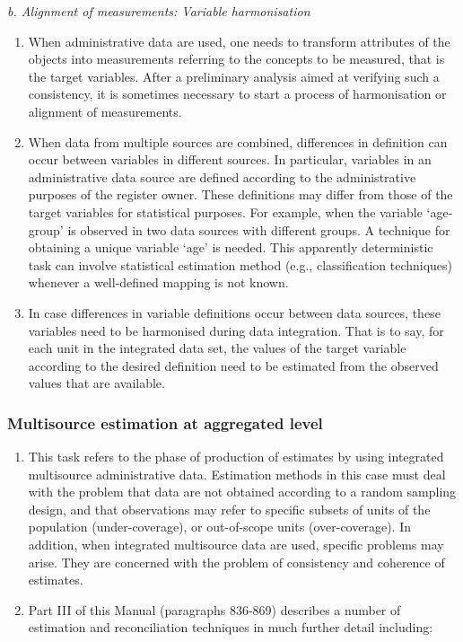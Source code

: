 \documentclass[
]{article}
\begin{document}
\emph{b. Alignment of measurements: Variable harmonisation}

\begin{enumerate}
\def\labelenumi{\arabic{enumi}.}
\setcounter{enumi}{231}
\item
  When administrative data are used, one needs to transform
  attributes of the objects into measurements referring to the
  concepts to be measured, that is the target variables. After a
  preliminary analysis aimed at verifying such a consistency, it is
  sometimes necessary to start a process of harmonisation or alignment
  of measurements.
\item
  When data from multiple sources are combined, differences in
  definition can occur between variables in different sources. In
  particular, variables in an administrative data source are defined
  according to the administrative purposes of the register owner.
  These definitions may differ from those of the target variables for
  statistical purposes. For example, when the variable `age-group' is
  observed in two data sources with different groups. A technique for
  obtaining a unique variable `age' is needed. This apparently
  deterministic task can involve statistical estimation method (e.g.,
  classification techniques) whenever a well-defined mapping is not
  known.
\item
  In case differences in variable definitions occur between data
  sources, these variables need to be harmonised during data
  integration. That is to say, for each unit in the integrated data
  set, the values of the target variable according to the desired
  definition need to be estimated from the observed values that are
  available.
\end{enumerate}

\hypertarget{d.4.-multisource-estimation-at-aggregated-level}{%
\subsubsection{Multisource estimation at aggregated level}\label{d.4.-multisource-estimation-at-aggregated-level}}

\begin{enumerate}
\def\labelenumi{\arabic{enumi}.}
\setcounter{enumi}{234}
\item
  This task refers to the phase of production of estimates by using
  integrated multisource administrative data. Estimation methods in
  this case must deal with the problem that data are not obtained
  according to a random sampling design, and that observations may
  refer to specific subsets of units of the population
  (under-coverage), or out-of-scope units (over-coverage). In
  addition, when integrated multisource data are used, specific
  problems may arise. They are concerned with the problem of
  consistency and coherence of estimates.
\item
  Part III of this Manual (paragraphs 836-869) describes a number of
  estimation and reconciliation techniques in much further detail
  including:
\end{enumerate}
\end{document}
